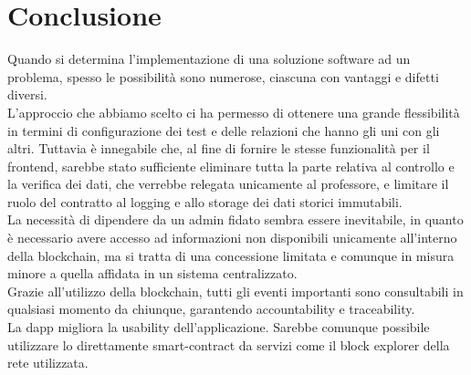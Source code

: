 \section{Conclusione}

Quando si determina l'implementazione di una soluzione software ad un problema,
spesso le possibilità sono numerose, ciascuna con vantaggi e difetti diversi. \\
L'approccio che abbiamo scelto ci ha permesso di ottenere una grande flessibilità
in termini di configurazione dei test e delle relazioni che hanno gli uni con gli altri.
Tuttavia è innegabile che, al fine di fornire le stesse funzionalità per il frontend,
sarebbe stato sufficiente eliminare tutta la parte relativa al controllo e la verifica dei dati,
che verrebbe relegata unicamente al professore, e limitare il ruolo del contratto al logging e allo storage dei dati storici immutabili. \\
La necessità di dipendere da un admin fidato sembra essere inevitabile,
in quanto è necessario avere accesso ad informazioni non disponibili unicamente all'interno della blockchain,
ma si tratta di una concessione limitata e comunque in misura minore a quella affidata in un sistema centralizzato. \\
Grazie all'utilizzo della blockchain, tutti gli eventi importanti sono consultabili in qualsiasi momento da chiunque,
garantendo accountability e traceability. \\
La \gls{dapp} migliora la usability dell'applicazione.
Sarebbe comunque possibile utilizzare lo direttamente \gls{smart-contract} da servizi come il block explorer della rete utilizzata.